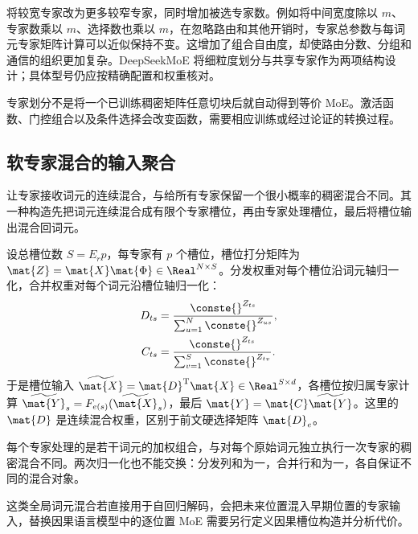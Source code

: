 \documentclass[../textbook.tex]{subfiles}
\begin{document}
将较宽专家改为更多较窄专家，同时增加被选专家数。例如将中间宽度除以 $m$、专家数乘以 $m$、选择数也乘以 $m$，在忽略路由和其他开销时，专家总参数与每词元专家矩阵计算可以近似保持不变。这增加了组合自由度，却使路由分数、分组和通信的组织更加复杂。DeepSeekMoE 将细粒度划分与共享专家作为两项结构设计\cite{dai2024deepseekmoe}；具体型号仍应按精确配置和权重核对。

专家划分不是将一个已训练稠密矩阵任意切块后就自动得到等价 MoE。激活函数、门控组合以及条件选择会改变函数，需要相应训练或经过论证的转换过程。

\subsection{软专家混合的输入聚合}
让专家接收词元的连续混合，与给所有专家保留一个很小概率的稠密混合不同。其一种构造先把词元连续混合成有限个专家槽位，再由专家处理槽位，最后将槽位输出混合回词元\cite{puigcerver2024softmoe}。

设总槽位数 $S=E_rp$，每专家有 $p$ 个槽位，槽位打分矩阵为 $\mat{Z}=\mat{X}\mat{\Phi}\in\Real^{N\times S}$。分发权重对每个槽位沿词元轴归一化，合并权重对每个词元沿槽位轴归一化：
\begin{equation}
\begin{aligned}
 D_{ts} &= \frac{\conste{}^{Z_{ts}}}{\sum_{u=1}^{N}\conste{}^{Z_{us}}}, \\
 C_{ts} &= \frac{\conste{}^{Z_{ts}}}{\sum_{v=1}^{S}\conste{}^{Z_{tv}}}.
\end{aligned}
\end{equation}
于是槽位输入 $\widetilde{\mat{X}}=\mat{D}^{\mathrm{T}}\mat{X}\in\Real^{S\times d}$，各槽位按归属专家计算 $\widetilde{\mat{Y}}_s=F_{e(s)}(\widetilde{\mat{X}}_s)$，最后 $\mat{Y}=\mat{C}\widetilde{\mat{Y}}$。这里的 $\mat{D}$ 是连续混合权重，区别于前文硬选择矩阵 $\mat{D}_e$。

每个专家处理的是若干词元的加权组合，与对每个原始词元独立执行一次专家的稠密混合不同。两次归一化也不能交换：分发列和为一，合并行和为一，各自保证不同的混合对象。

这类全局词元混合若直接用于自回归解码，会把未来位置混入早期位置的专家输入，替换因果语言模型中的逐位置 MoE 需要另行定义因果槽位构造并分析代价。
\end{document}
